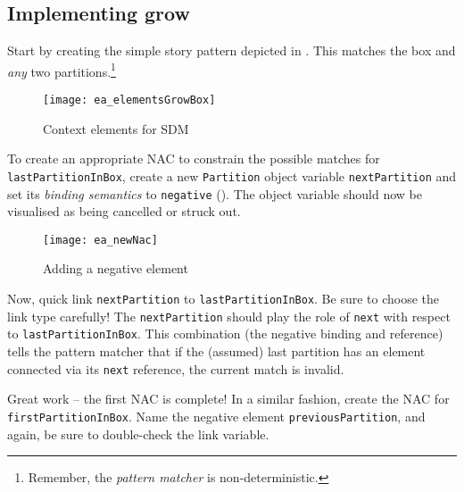 \newpage
\hypertarget{growBox vis}{}
\subsection{Implementing grow}
\genHeader

\begin{stepbystep}
 
\item Start by creating the simple story pattern depicted in . This matches the box and \emph{any} two
partitions.\footnote{Remember, the \emph{pattern matcher} is non-deterministic.}

\vspace{0.5cm}

\begin{figure}[htbp]
\begin{center}
  \texttt{[image: ea\_elementsGrowBox]}
  \caption{Context elements for SDM}  
  \label{ea:sdm_growContext}
\end{center}
\end{figure}

\item To create an appropriate \mbox{NAC} to constrain the possible matches for \texttt{lastPartitionInBox},  create a new
\texttt{Partition} object variable \texttt{next\-Part\-ition} and set its \emph{binding semantics} to \texttt{negative} (). The object
variable should now be visualised as being cancelled or struck out.
 
\begin{figure}[htbp]
\begin{center}
  \texttt{[image: ea\_newNac]}
  \caption{Adding a negative element}  
  \label{ea:sdm_negOV}
\end{center}
\end{figure}
 
\item Now, quick link \texttt{nextPartition} to \texttt{lastPartitionInBox}. Be sure to choose the link type carefully! The
\texttt{nextPartition} should play the role of \texttt{next} with respect to \texttt{lastPartitionInBox}. This combination (the negative binding and reference)
tells the pattern matcher that if the (assumed) last partition has an element connected via its \texttt{next} reference, the current match is invalid.

\item Great work -- the first NAC is complete! In a similar fashion, create the NAC for \texttt{firstPartitionInBox}. Name the
negative element \texttt{previousPartition}, and again, be sure to double-check the link variable.


\end{stepbystep}
